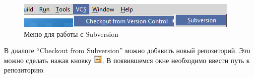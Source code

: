 \documentclass[a4paper,12pt]{article}
\begin{document}
\begin{figure}[h!]
	\centering
	\includegraphics[scale=0.80]{intellij-idea-1.png}
	\vspace{-10pt}
	\caption{Меню для работы с Subversion}
\end{figure}
\vspace{-10pt}
В диалоге ``Checkout from Subversion'' можно добавить новый репозиторий. Это
можно сделать нажав кновку
\includegraphics[scale=0.80]{intellij-idea-add-repo.png}. В появившемся окне
необходимо ввести путь к репозиторию.

\begin{figure}[h!]
	\begin{minipage}[h]{0.49\linewidth}
	\end{minipage}
	\hfill
	\begin{minipage}[h]{0.49\linewidth}
	\end{minipage}
\end{figure}
 
\end{document}
